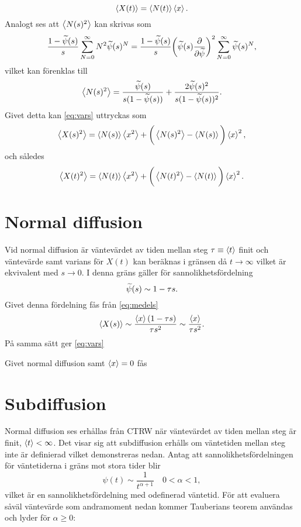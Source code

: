 \begin{equation}\label{eq:medelt}
   \ev{X(t)} = \ev{N(t)}\ev{x}.
\end{equation}
Analogt ses att $\ev{N(s)^2}$ kan skrivas som
\begin{equation}
   \frac{1-\widetilde{\psi} (s)}{s}\sum_{N=0}^{\infty}N^2\widetilde{\psi} (s)^N = \frac{1-\widetilde{\psi} (s)}{s}\bigg (\widetilde{\psi} (s)\frac{\partial}{\partial \widetilde{\psi}} \bigg )^2\sum_{N=0}^{\infty}\widetilde{\psi} (s)^N,
\end{equation}
vilket kan förenklas till 
\begin{equation}
   \ev{N(s)^2} = \frac{\psis (s)}{s(1-\psis (s))}+\frac{2\psis (s)^2}{s(1-\psis (s))^2}.
\end{equation}
Givet detta kan \eqref{eq:vars} uttryckas som 
\begin{equation}
   \ev{X(s)^2} = \ev{N(s)}\ev{x^2}+\bigg (\ev{N(s)^2}-\ev{N(s)}\bigg )\ev{x}^2,
\end{equation}
och således
\begin{equation}\label{eq:vart}
      \ev{X(t)^2} = \ev{N(t)}\ev{x^2}+\bigg (\ev{N(t)^2}-\ev{N(t)}\bigg )\ev{x}^2.
\end{equation}





\section{Normal diffusion}
Vid normal diffusion är väntevärdet av tiden mellan steg $\tau\equiv\ev{t}$ finit och väntevärde samt varians för $X(t)$ kan beräknas i gränsen då $t\to\infty$ vilket är ekvivalent med $s\to0$. I denna gräns gäller för sannolikhetsfördelning 
\begin{equation}
\widetilde{\psi} (s) \sim 1-\tau s.
\end{equation}
Givet denna fördelning fås från \eqref{eq:medels}
\begin{equation}
   \ev{X(s)}\sim \frac{\ev{x}(1-\tau s)}{\tau s^2}\sim\frac{\ev{x}}{\tau s^2}.
\end{equation}
På samma sätt ger \eqref{eq:vars}

Givet normal diffusion samt $\ev{x}=0$ fås 

\section{Subdiffusion}

Normal diffusion ses erhållas från CTRW när väntevärdet av tiden mellan steg är finit, $\ev{t}<\infty$. Det visar sig att subdiffusion erhålls om väntetiden mellan steg inte är definierad vilket demonstreras nedan. Antag att sannolikhetsfördelningen för väntetiderna i gräns mot stora tider blir 
\begin{equation}
\psi(t) \sim \frac{1}{t^{\alpha+1}}\quad 0<\alpha<1,
\end{equation}
vilket är en sannolikhetsfördelning med odefinerad väntetid. För att evaluera såväl väntevärde som andramoment nedan kommer Tauberians teorem\cite{Feller_prob1971} användas och lyder för $\alpha\geq0$:

